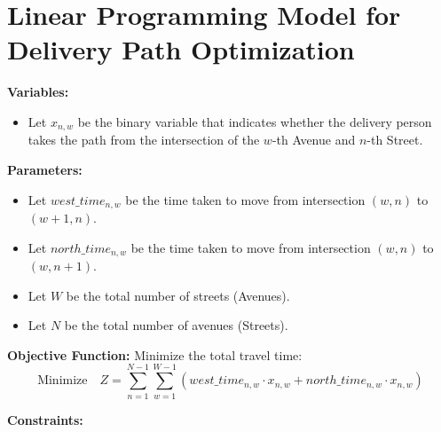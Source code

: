 \documentclass{article}
\begin{document}
\section*{Linear Programming Model for Delivery Path Optimization}

\textbf{Variables:}
\begin{itemize}
    \item Let \( x_{n,w} \) be the binary variable that indicates whether the delivery person takes the path from the intersection of the \( w \)-th Avenue and \( n \)-th Street.
\end{itemize}

\textbf{Parameters:}
\begin{itemize}
    \item Let \( west\_time_{n,w} \) be the time taken to move from intersection \( (w, n) \) to \( (w+1, n) \).
    \item Let \( north\_time_{n,w} \) be the time taken to move from intersection \( (w, n) \) to \( (w, n+1) \).
    \item Let \( W \) be the total number of streets (Avenues).
    \item Let \( N \) be the total number of avenues (Streets).
\end{itemize}

\textbf{Objective Function:}
Minimize the total travel time:
\[
\text{Minimize} \quad Z = \sum_{n=1}^{N-1} \sum_{w=1}^{W-1} \left( west\_time_{n,w} \cdot x_{n,w} + north\_time_{n,w} \cdot x_{n,w} \right)
\]

\textbf{Constraints:}
\end{document}
